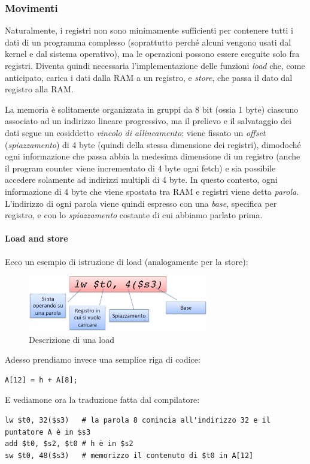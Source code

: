\documentclass[class=book, crop=false]{standalone}
\begin{document}
\subsubsection{Movimenti}
Naturalmente, i registri non sono minimamente sufficienti per contenere tutti i dati di un programma complesso (soprattutto perché alcuni vengono usati dal kernel e dal sistema operativo), ma le operazioni possono essere eseguite solo fra registri. Diventa quindi necessaria l'implementazione delle funzioni \emph{load} che, come anticipato, carica i dati dalla RAM a un registro, e \emph{store}, che passa il dato dal registro alla RAM.

La memoria è solitamente organizzata in gruppi da 8 bit (ossia 1 byte) ciascuno associato ad  un indirizzo lineare progressivo, ma il prelievo e il salvataggio dei dati segue un cosiddetto \emph{vincolo di allineamento}: viene fissato un \emph{offset} (\emph{spiazzamento}) di 4 byte (quindi della stessa dimensione dei registri), dimodoché ogni informazione che passa abbia la medesima dimensione di un registro (anche il program counter viene incrementato di 4 byte ogni fetch) e sia possibile accedere solamente ad indirizzi multipli di 4 byte. In questo contesto, ogni informazione di 4 byte che viene spostata tra RAM e registri viene detta \emph{parola}.\\
L'indirizzo di ogni parola viene quindi espresso con una \emph{base}, specifica per registro, e con lo \emph{spiazzamento} costante di cui abbiamo parlato prima.

\paragraph{Load and store}
Ecco un esempio di istruzione di load (analogamente per la store):
\begin{figure}[H]
	\centering
	\includegraphics[width=0.7\textwidth,keepaspectratio]{load}
	\caption{Descrizione di una load}
\end{figure}
Adesso prendiamo invece una semplice riga di codice:
\begin{verbatim}
A[12] = h + A[8];
\end{verbatim}
E vediamone ora la traduzione fatta dal compilatore:
\begin{verbatim}
lw $t0, 32($s3)   # la parola 8 comincia all'indirizzo 32 e il puntatore A è in $s3
add $t0, $s2, $t0 # h è in $s2
sw $t0, 48($s3)   # memorizzo il contenuto di $t0 in A[12]
\end{verbatim}
\end{document}
